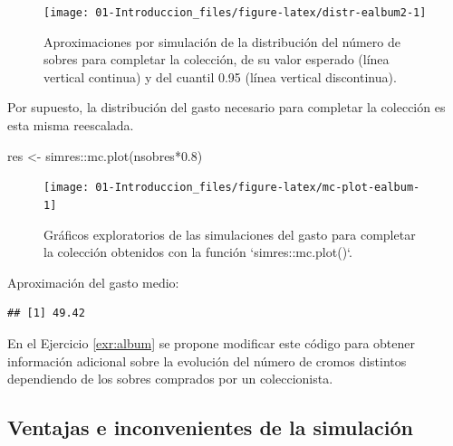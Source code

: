 \documentclass[
]{book}
\newenvironment{Shaded}{\begin{snugshade}}{\end{snugshade}}
\newcommand{\CommentTok}[1]{\textcolor[rgb]{0.56,0.35,0.01}{\textit{#1}}}
\newcommand{\FloatTok}[1]{\textcolor[rgb]{0.00,0.00,0.81}{#1}}
\newcommand{\FunctionTok}[1]{\textcolor[rgb]{0.00,0.00,0.00}{#1}}
\newcommand{\NormalTok}[1]{#1}
\newcommand{\OtherTok}[1]{\textcolor[rgb]{0.56,0.35,0.01}{#1}}
\newcommand{\SpecialCharTok}[1]{\textcolor[rgb]{0.00,0.00,0.00}{#1}}
\theoremstyle{break}
\theoremstyle{nonumberplain}
\renewcommand{\CommentTok}[1]{\textcolor[rgb]{0.41,0.41,0.41}{\texttt{#1}}}
\begin{document}
\begin{figure}[!htb]

{\centering \texttt{[image: 01-Introduccion\_files/figure-latex/distr-ealbum2-1]} 

}

\caption{Aproximaciones por simulación de la distribución del número de sobres para completar la colección, de su valor esperado (línea vertical continua) y del cuantil 0.95 (línea vertical discontinua).}\label{fig:distr-ealbum2}
\end{figure}

Por supuesto, la distribución del gasto necesario para completar la colección es esta misma reescalada.

\begin{Shaded}
\begin{Highlighting}[]
\NormalTok{res }\OtherTok{\textless{}{-}}\NormalTok{ simres}\SpecialCharTok{::}\FunctionTok{mc.plot}\NormalTok{(nsobres}\SpecialCharTok{*}\FloatTok{0.8}\NormalTok{)}
\end{Highlighting}
\end{Shaded}

\begin{figure}[!htb]

{\centering \texttt{[image: 01-Introduccion\_files/figure-latex/mc-plot-ealbum-1]} 

}

\caption{Gráficos exploratorios de las simulaciones del gasto para completar la colección obtenidos con la función `simres::mc.plot()`.}\label{fig:mc-plot-ealbum}
\end{figure}

Aproximación del gasto medio:

\begin{Shaded}
\end{Shaded}

\begin{verbatim}
## [1] 49.42
\end{verbatim}

En el Ejercicio \ref{exr:album} se propone modificar este código para obtener información adicional sobre la evolución del número de cromos distintos dependiendo de los sobres comprados por un coleccionista.

\hypertarget{ventajas-e-inconvenientes-de-la-simulaciuxf3n}{%
\subsection{Ventajas e inconvenientes de la simulación}\label{ventajas-e-inconvenientes-de-la-simulaciuxf3n}}
\end{document}
